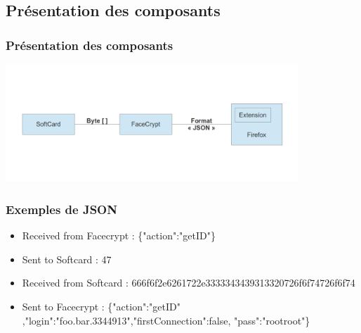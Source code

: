 \documentclass{beamer}
\begin{document}
\subsection{Présentation des composants}
\begin{frame}
    \frametitle{Présentation des composants}

 \includegraphics[width=11cm]{schema_dolby}



\end{frame}



\begin{frame}
    \frametitle{Exemples de JSON}
\begin{itemize}
\item Received from Facecrypt : \{"action":"getID"\}


\item Sent to Softcard : 47


\item Received from Softcard : 666f6f2e6261722e3333343439313320726f6f74726f6f74


\item Sent to Facecrypt : \{"action":"getID" ,"login":"foo.bar.3344913","firstConnection":false, "pass":"rootroot"\}
\end{itemize}



\end{frame}
\end{document}
